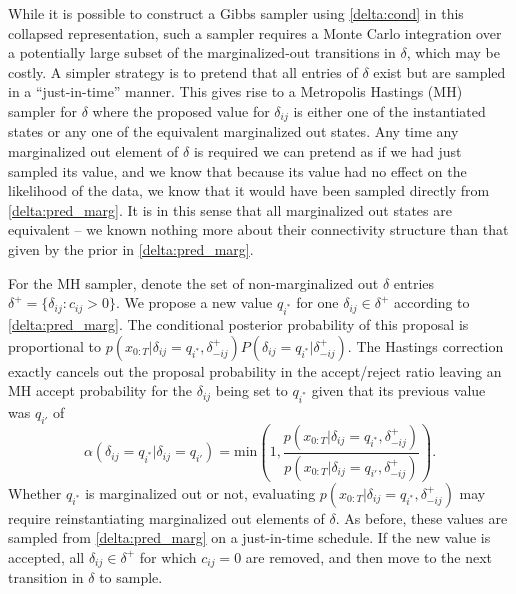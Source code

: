 While it is possible to construct a Gibbs sampler using \eqref{delta:cond} in this collapsed representation, such a sampler requires a Monte Carlo integration over a potentially large subset of the marginalized-out transitions in $\delta$, which may be costly.  A simpler strategy is to pretend that all entries of $\delta$ exist but are sampled in a ``just-in-time'' manner.  
This gives rise to a Metropolis Hastings (MH) sampler for $\delta$ where the proposed value for $\delta_{ij}$ is either one of the instantiated states or any one of the equivalent marginalized out states.   Any time any marginalized out element of $\delta$ is required we can pretend as if we had just sampled its value, and we know that because its value had no effect on the likelihood of the data, we know that it would have been sampled directly from \eqref{delta:pred_marg}.  It is in this sense that all marginalized out states are equivalent -- we known nothing more about their connectivity structure than that given by the prior in \eqref{delta:pred_marg}.

   For the MH sampler, denote the set of non-marginalized out $\delta$ entries $\delta^+ = \{ \delta_{ij} : c_{ij} > 0\}.$ We propose a new value $q_{i^*}$ for one $\delta_{ij}\in\delta^+$ according to \eqref{delta:pred_marg}.  The conditional posterior probability of this proposal is proportional to $p(x_{0:T}|\delta_{ij}=q_{i^*},\delta^+_{-ij})P(\delta_{ij} = q_{i^*}|\delta^+_{-ij})$.  The Hastings correction exactly cancels out the proposal probability in the accept/reject ratio leaving an MH accept probability for the $\delta_{ij}$ being set to $q_{i^*}$ given that its previous value was $q_{i'}$ of
%
\begin{equation}
 \alpha(\delta_{ij}=q_{i^*} | \delta_{ij}=q_{i'}) =  \mathrm{min}\left(1,\frac{p(x_{0:T}|\delta_{ij}=q_{i^*},\delta_{-ij}^+)}{p(x_{0:T}|\delta_{ij}=q_{i'},\delta_{-ij}^+)}\right). \label{delta:mh}
\end{equation}
%
Whether $q_{i^*}$ is marginalized out or not, evaluating $p(x_{0:T}|\delta_{ij}=q_{i^*},\delta_{-ij}^+)$ may require reinstantiating marginalized out elements of $\delta$.  As before, these values are sampled from \eqref{delta:pred_marg} on a just-in-time schedule.  If the new value is accepted, all $\delta_{ij} \in \delta^+$ for which $c_{ij} = 0$ are removed, and then move to the next transition in $\delta$ to sample.

